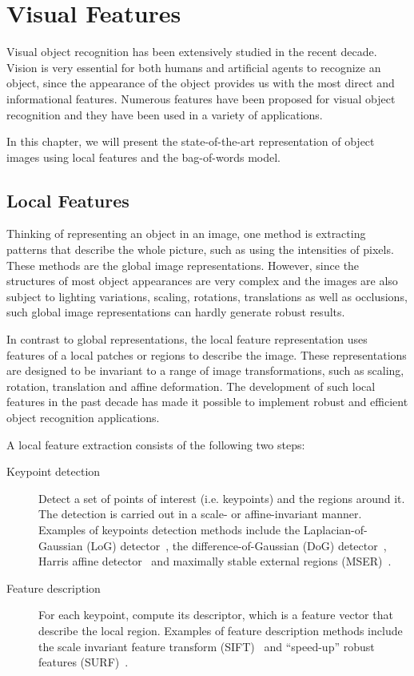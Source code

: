 \documentclass[12pt,final,twoside]{report}
\begin{document}
\cleardoublepage

\chapter{Visual Features}
\label{ch:visual}

Visual object recognition has been extensively studied in the recent decade. Vision is very essential for both humans and artificial agents to recognize an object, since the appearance of the object provides us with the most direct and informational features. Numerous features have been proposed for visual object recognition and they have been used in a variety of applications.

In this chapter, we will present the state-of-the-art representation of object images using local features and the bag-of-words model.

\section{Local Features}
Thinking of representing an object in an image, one method is extracting patterns that describe the whole picture, such as using the intensities of pixels. These methods are the global image representations. However, since the structures of most object appearances are very complex and the images are also subject to lighting variations, scaling, rotations, translations as well as occlusions, such global image representations can hardly generate robust results. 

In contrast to global representations, the local feature representation uses features of a local patches or regions to describe the image. These representations are designed to be invariant to a range of image transformations, such as scaling, rotation, translation and affine deformation. The development of such local features in the past decade has made it possible to implement robust and efficient object recognition applications.

A local feature extraction consists of the following two steps: 
\begin{description}
  \item[Keypoint detection] Detect a set of points of interest (i.e. keypoints) and the regions around it. The detection is carried out in a scale- or affine-invariant manner. Examples of keypoints detection methods include the Laplacian-of-Gaussian (LoG) detector~\cite{lindeberg_feature_1998}, the difference-of-Gaussian (DoG) detector~\cite{lowe_object_1999}, Harris affine detector~\cite{mikolajczyk_scale_2004} and maximally stable external regions (MSER)~\cite{matas_robust_2004}. 
  \item[Feature description] For each keypoint, compute its descriptor, which is a feature vector that describe the local region. Examples of feature description methods include the scale invariant feature transform (SIFT)~\cite{lowe_object_1999} and ``speed-up'' robust features (SURF)~\cite{bay_speeded-up_2008}.
\end{description}
\end{document}
